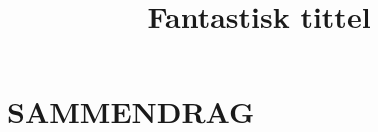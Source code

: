 \documentclass[12pt]{article}
\title{Fantastisk tittel}
\begin{document}
\addFrontPage
\addSecondPage
\setlength{\parskip}{0em}
\newpage
\tableofcontents
\newpage
\setlength{\parskip}{1em}
\section*{SAMMENDRAG}
\getSummary{}







\newpage

\newpage

\end{document}
